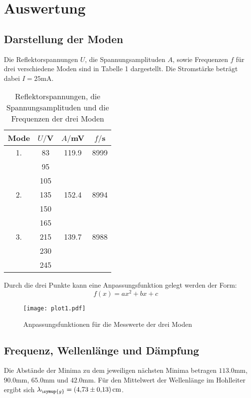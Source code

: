 \section{Auswertung}
\label{sec:Auswertung}

\subsection{Darstellung der Moden}
Die Reflektorspannungen $U$, die Spannungsamplituden $A$, sowie Frequenzen $f$ für drei verschiedene Moden sind in Tabelle 1 dargestellt.
Die Stromstärke beträgt dabei $I = 25$mA.



\begin{table}[H]
  \centering
  \caption{Reflektorspannungen, die Spannungsamplituden und die Frequenzen der drei Moden}
  \label{tab:Parameter}
  \begin{tabular}{c c c c}
    \toprule
    Mode & $U/$V & $A/$mV& $f/$s\\
    \midrule
    1. & 83  &   119.9& 8999 \\
       & 95  & &       \\
       & 105 & &       \\
    2. & 135 &    152.4 & 8994 \\
       & 150 & & \\
       & 165 & & \\
    3. & 215 &  139.7  & 8988 \\
       & 230 & & \\
       & 245 & & \\
    \bottomrule
  \end{tabular}
\end{table}

Durch die drei Punkte kann eine Anpassungsfunktion gelegt werden der Form:
\begin{equation*}
  f(x)=ax^2+bx+c
\end{equation*}
\begin{figure}
  \centering
  \texttt{[image: plot1.pdf]}
  \caption{Anpassungsfunktionen für die Messwerte der drei Moden}
  \label{fig:plot}
\end{figure}



\subsection{Frequenz, Wellenlänge und Dämpfung}
Die Abstände der Minima zu dem jeweiligen nächsten Minima betragen $113.0$mm, $90.0$mm,
$65.0$mm und $42.0$mm.
Für den Mittelwert der Wellenlänge im Hohlleiter ergibt sich $\lambda_{\symup{g}} =\SI{4.73(13)}{\centi\meter}$.


